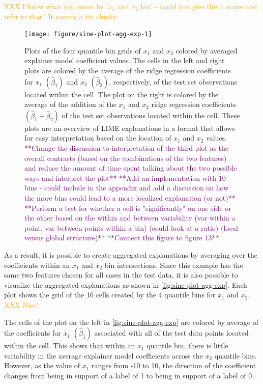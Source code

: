 \documentclass[AMS,STIX2COL]{WileyNJD-v2}\usepackage[]{graphicx}\usepackage[]{color}
\newenvironment{knitrout}{}{} %
\newcommand{\hh}[1]{\textcolor{orange}{#1}}
\newcommand{\kgc}[1]{\textcolor{purple}{#1}}
\begin{document}
{\hh{XXX I know what you mean by '$x_1$ and $x_2$ bin' - could you give this a name and refer to that? It sounds a bit clunky}

\begin{figure}[!htbp]
\begin{knitrout}
\color{fgcolor}
\texttt{[image: figure/sine-plot-agg-exp-1]} 

\end{knitrout}
\caption{Plots of the four quantile bin grids of $x_1$ and $x_2$ colored by averaged explainer model coefficient values. The cells in the left and right plots are colored by the average of the ridge regression coefficients for $x_1$ $\left(\hat{\beta}_1\right)$ and $x_2$ $\left(\hat{\beta}_2\right)$, respectively, of the test set observations located within the cell. The plot on the right is colored by the average of the addition of the $x_1$ and $x_2$ ridge regression coefficients $\left(\hat{\beta}_1+\hat{\beta}_2\right)$ of the test set observations located within the cell. These plots are an overview of LIME explanations in a format that allows for easy interpretation based on the location of $x_1$ and $x_2$ values. \kgc{**Change the discussion to interpretation of the third plot as the overall contrasts (based on the combinations of the two features) and reduce the amount of time spent talking about the two possible ways and interpret the plot**} \kgc{**Add an implementation with 10 bins - could include in the appendix and add a discussion on how the more bins could lead to a more localized explanation (or not)**} \kgc{**Perform a test for whether a cell is "significantly" on one side or the other based on the within and between variability (var within a point, var between points within a bin) (could look at a ratio) (local versus global structure)}** **\kgc{Connect this figure to figure 13}**}
\label{fig:sine-plot-agg-exp}
\end{figure}

As a result, it is possible to create aggregated explanations by averaging over the coefficients within an $x_1$ and $x_2$ bin intersections. Since this example has the same two features chosen for all cases in the test data, it is also possible to visualize the aggregated explanations as shown in \autoref{fig:sine-plot-agg-exp}. Each plot shows the grid of the 16 cells created by the 4 quantile bins for $x_1$ and $x_2$.
\hh{XXX Nice!}


The cells of the plot on the left in \autoref{fig:sine-plot-agg-exp} are colored by average of the coefficients for $x_1$ $\left(\hat{\beta}_1\right)$ associated with all of the test data points located within the cell. This shows that within an $x_1$ quantile bin, there is little variability in the average explainer model coefficients across the $x_2$ quantile bins. However, as the value of $x_1$ ranges from -10 to 10, the direction of the coefficient changes from being in support of a label of 1 to being in support of a label of 0.




}
\end{document}
